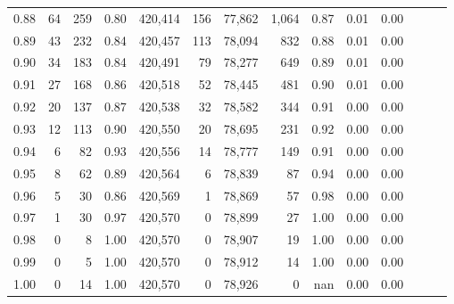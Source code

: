 \begin{tabular}{rrrrrrrrrrrrrr}
0.88 &      64 &    259 &  0.80 &  420,414 &      156 &  77,862 &   1,064 &  0.87 &  0.01 &      0.00 \\
0.89 &      43 &    232 &  0.84 &  420,457 &      113 &  78,094 &     832 &  0.88 &  0.01 &      0.00 \\
0.90 &      34 &    183 &  0.84 &  420,491 &       79 &  78,277 &     649 &  0.89 &  0.01 &      0.00 \\
0.91 &      27 &    168 &  0.86 &  420,518 &       52 &  78,445 &     481 &  0.90 &  0.01 &      0.00 \\
0.92 &      20 &    137 &  0.87 &  420,538 &       32 &  78,582 &     344 &  0.91 &  0.00 &      0.00 \\
0.93 &      12 &    113 &  0.90 &  420,550 &       20 &  78,695 &     231 &  0.92 &  0.00 &      0.00 \\
0.94 &       6 &     82 &  0.93 &  420,556 &       14 &  78,777 &     149 &  0.91 &  0.00 &      0.00 \\
0.95 &       8 &     62 &  0.89 &  420,564 &        6 &  78,839 &      87 &  0.94 &  0.00 &      0.00 \\
0.96 &       5 &     30 &  0.86 &  420,569 &        1 &  78,869 &      57 &  0.98 &  0.00 &      0.00 \\
0.97 &       1 &     30 &  0.97 &  420,570 &        0 &  78,899 &      27 &  1.00 &  0.00 &      0.00 \\
0.98 &       0 &      8 &  1.00 &  420,570 &        0 &  78,907 &      19 &  1.00 &  0.00 &      0.00 \\
0.99 &       0 &      5 &  1.00 &  420,570 &        0 &  78,912 &      14 &  1.00 &  0.00 &      0.00 \\
1.00 &       0 &     14 &  1.00 &  420,570 &        0 &  78,926 &       0 &   nan &  0.00 &      0.00 \\
\bottomrule
\end{tabular}
